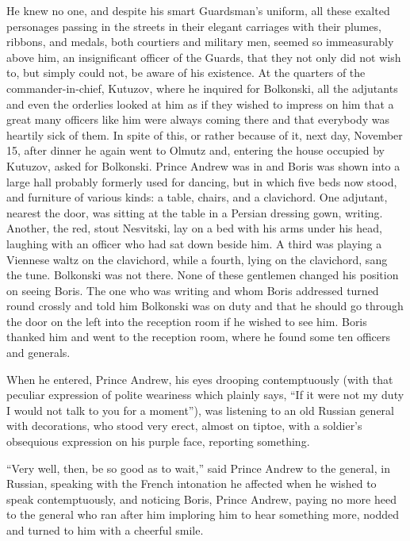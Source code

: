 He knew no one, and despite his smart Guardsman's uniform, all
these exalted personages passing in the streets in their elegant
carriages with their plumes, ribbons, and medals, both courtiers
and military men, seemed so immeasurably above him, an
insignificant officer of the Guards, that they not only did not
wish to, but simply could not, be aware of his existence. At the
quarters of the commander-in-chief, Kutuzov, where he inquired
for Bolkonski, all the adjutants and even the orderlies looked at
him as if they wished to impress on him that a great many
officers like him were always coming there and that everybody was
heartily sick of them. In spite of this, or rather because of it,
next day, November 15, after dinner he again went to Olmutz and,
entering the house occupied by Kutuzov, asked for
Bolkonski. Prince Andrew was in and Boris was shown into a large
hall probably formerly used for dancing, but in which five beds
now stood, and furniture of various kinds: a table, chairs, and a
clavichord. One adjutant, nearest the door, was sitting at the
table in a Persian dressing gown, writing. Another, the red,
stout Nesvitski, lay on a bed with his arms under his head,
laughing with an officer who had sat down beside him. A third was
playing a Viennese waltz on the clavichord, while a fourth, lying
on the clavichord, sang the tune. Bolkonski was not there. None
of these gentlemen changed his position on seeing Boris. The one
who was writing and whom Boris addressed turned round crossly and
told him Bolkonski was on duty and that he should go through the
door on the left into the reception room if he wished to see
him. Boris thanked him and went to the reception room, where he
found some ten officers and generals.

When he entered, Prince Andrew, his eyes drooping contemptuously
(with that peculiar expression of polite weariness which plainly
says, ``If it were not my duty I would not talk to you for a
moment''), was listening to an old Russian general with
decorations, who stood very erect, almost on tiptoe, with a
soldier's obsequious expression on his purple face, reporting
something.

``Very well, then, be so good as to wait,'' said Prince Andrew to
the general, in Russian, speaking with the French intonation he
affected when he wished to speak contemptuously, and noticing
Boris, Prince Andrew, paying no more heed to the general who ran
after him imploring him to hear something more, nodded and turned
to him with a cheerful smile.

